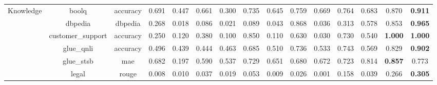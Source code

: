 \begin{landscape}
\begin{table}[ht]
{\begin{tabular}{ccccccccccccccc}
\midrule
\multirow{8}{*}{Knowledge}         & boolq                          & accuracy                         & 0.691              & 0.447             & 0.661                      & 0.300             & 0.735                      & 0.645               & 0.759                    & 0.669               & 0.764                        & 0.683                   & 0.870                  & \textbf{0.911} \\
                                   & dbpedia                        & dbpedia                          & 0.268              & 0.018             & 0.086                      & 0.021             & 0.089                      & 0.043               & 0.868                    & 0.036               & 0.313                        & 0.578                   & 0.853                  & \textbf{0.965} \\
                                   & customer\_support              & accuracy                         & 0.250              & 0.120             & 0.380                      & 0.100             & 0.850                      & 0.110               & 0.630                    & 0.030               & 0.730                        & 0.540                   & \textbf{1.000}         & \textbf{1.000} \\
                                   & glue\_qnli                     & accuracy                         & 0.496              & 0.439             & 0.444                      & 0.463             & 0.685                      & 0.510               & 0.736                    & 0.533               & 0.743                        & 0.569                   & 0.829                  & \textbf{0.902} \\
                                   & glue\_stsb                     & mae                              & 0.682              & 0.197             & 0.590                      & 0.537             & 0.729                      & 0.651               & 0.680                    & 0.672               & 0.723                        & 0.814                   & \textbf{0.857}         & 0.773          \\
                                   & legal                          & rouge                            & 0.008              & 0.010             & 0.037                      & 0.019             & 0.053                      & 0.009               & 0.026                    & 0.001               & 0.158                        & 0.039                   & 0.266                  & \textbf{0.305} \\

\end{tabular}}
\end{table}
\end{landscape}
